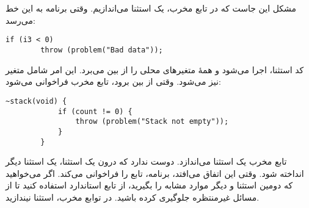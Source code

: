 \section{}
\paragraph{}\label{answer:55}
 مشکل این جاست که در تابع مخرب، یک استثنا می‌اندازیم. وقتی برنامه به این خط می‌رسد:
 \begin{LTR}
    \begin{lstlisting}[style=C++Style]
    if (i3 < 0)
        throw (problem("Bad data"));
    \end{lstlisting}
\end{LTR}

کد استثنا، اجرا می‌شود و همهٔ متغیرهای محلی را از بین می‌برد. این امر شامل متغیر  نیز می‌شود. وقتی  از بین برود، تابع مخرب فراخوانی می‌شود:
\begin{LTR}
    \begin{lstlisting}[style=C++Style]
        ~stack(void) {
            if (count != 0) {
                throw (problem("Stack not empty"));
            }
        }
    \end{lstlisting}
\end{LTR}

تابع مخرب یک استثنا می‌اندازد.  دوست ندارد که درون یک استثنا، یک استثنا دیگر انداخته شود. وقتی این اتفاق می‌افتد، برنامه، تابع  را فراخوانی می‌کند. اگر می‌خواهید که دومین استثنا و دیگر موارد مشابه را بگیرید، از تابع استاندارد  استفاده کنید تا از مسائل غیرمنتظره جلوگیری کرده باشید. در توابع مخرب، استثنا نیندازید.
